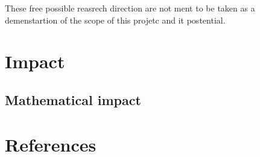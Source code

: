 \documentclass[11pt]{article}
\begin{document}
These free possible reasrech direction are not ment to be taken as a demenstartion of the scope of this projetc and it postential.



\section{Impact}

\subsection{Mathematical impact}

\subsection{}

\section{References}
\end{document}
